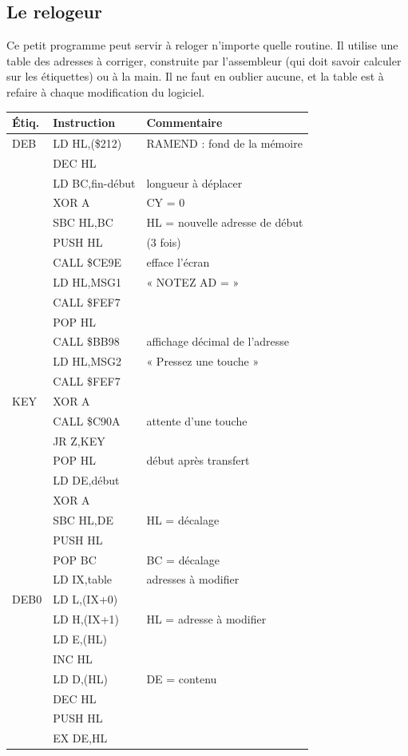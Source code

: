 \documentclass[a4paper,10pt]{article}
\makeatletter
\newenvironment{src}
  {\small\begin{longtable}{@{}>{\ttfamily}l>{\ttfamily}l>{\raggedright\arraybackslash}p{8.6cm}@{}}
   \toprule
   \normalfont\bfseries Étiq. & \normalfont\bfseries Instruction & \textbf{Commentaire}\\
   \midrule\endhead
   \bottomrule\endfoot}
  {\end{longtable}}
\makeatother
\begin{document}
\subsection*{Le relogeur}
Ce petit programme peut servir à reloger n'importe quelle routine. Il
utilise une table des adresses à corriger, construite par l'assembleur (qui
doit savoir calculer sur les étiquettes) ou à la main. Il ne faut en oublier
aucune, et la table est à refaire à chaque modification du logiciel.
\begin{src}
DEB & LD HL,(\$212) & RAMEND : fond de la mémoire \\
 & DEC HL & \\
 & LD BC,fin-début & longueur à déplacer \\
 & XOR A & CY = 0 \\
 & SBC HL,BC & HL = nouvelle adresse de début \\
 & PUSH HL & (3 fois) \\
 & CALL \$CE9E & efface l'écran \\
 & LD HL,MSG1 & « NOTEZ AD = » \\
 & CALL \$FEF7 & \\
 & POP HL & \\
 & CALL \$BB98 & affichage décimal de l'adresse \\
 & LD HL,MSG2 & « Pressez une touche » \\
 & CALL \$FEF7 & \\
KEY & XOR A & \\
 & CALL \$C90A & attente d'une touche \\
 & JR Z,KEY & \\
 & POP HL & début après transfert \\
 & LD DE,début & \\
 & XOR A & \\
 & SBC HL,DE & HL = décalage \\
 & PUSH HL & \\
 & POP BC & BC = décalage \\
 & LD IX,table & adresses à modifier \\
DEB0 & LD L,(IX+0) & \\
 & LD H,(IX+1) & HL = adresse à modifier \\
 & LD E,(HL) & \\
 & INC HL & \\
 & LD D,(HL) & DE = contenu \\
 & DEC HL & \\
 & PUSH HL & \\
 & EX DE,HL & \\

\end{src}
\end{document}

